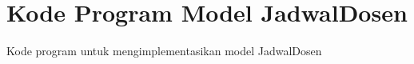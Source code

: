 \chapter{Kode Program Model JadwalDosen}
\label{Implementasi Modul Lihat Jadwal Dosen}

Kode program untuk mengimplementasikan model JadwalDosen



